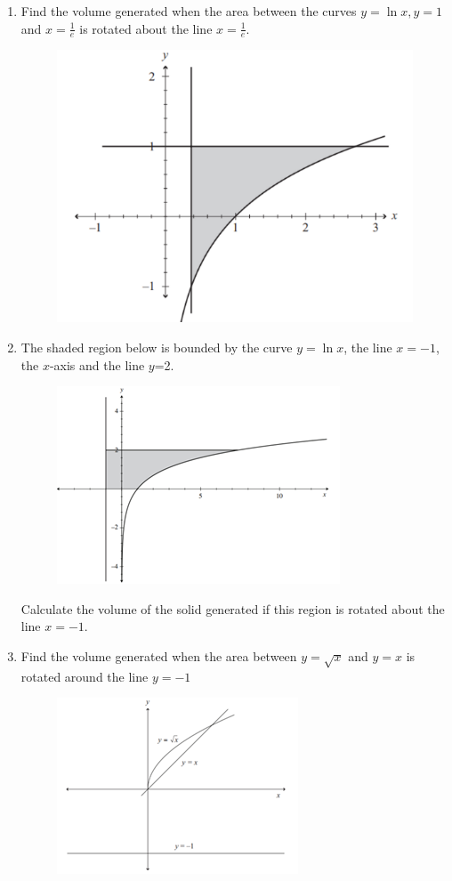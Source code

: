 \documentclass[../main.tex]{subfiles}
\begin{document}
\begin{enumerate}[itemsep=0.7cm]
    \item 
    Find the volume generated when the area between the curves $y=\ln{x}, y=1$ and $x=\frac{1}{e}$ is rotated about the line $x=\frac{1}{e}$.
    \begin{figure}[h]
        \centering
        \includegraphics{images/volrev13.png}
    \end{figure}

    \item 
    The shaded region below is bounded by the curve $y=\ln{x}$, the line $x=-1$, the $x$-axis and the line $y$=2.

    \begin{figure}[h]
        \centering
        \includegraphics[width=0.3\linewidth]{images/volrev14.png}
    \end{figure}

    Calculate the volume of the solid generated if this region is rotated about the line $x=-1$.

    \item 
    Find the volume generated when the area between $y=\sqrt{x}$ and $y=x$ is rotated around the line $y=-1$

    \begin{figure}[h]
        \centering
        \includegraphics{images/volrev15.png}
    \end{figure}


\end{enumerate}
\end{document}
